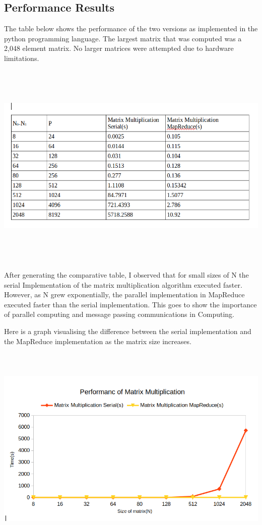 \documentclass[12pt, a4paper, fleqn, titlepage]{article}
\begin{document}
\subsection*{Performance Results}
    The table below shows the performance of the two versions as implemented in the python programming language. The largest matrix that was computed was a 2,048 element matrix. No larger matrices were attempted due to hardware limitations.
        \begin{center}  
            \includegraphics[width= 18cm,height = 10cm, keepaspectratio,scale=0.5]{performance-mapreduce}
        \end{center}

    After generating the comparative table, I observed that for small sizes of N the serial Implementation of the matrix multiplication algorithm executed faster. However, as N grew exponentially, the parallel implementation in MapReduce executed faster than the serial implementation. This goes to show the importance of parallel computing and message passing communications in Computing.

    Here is a graph visualising the difference between the serial implementation and the MapReduce implementation as the matrix size increases.
        \begin{center}  
            \includegraphics[width= 18cm,height = 10cm, keepaspectratio,scale=0.5]{graph}
        \end{center}
\end{document}
